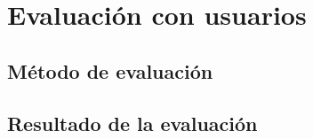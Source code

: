 
\cleardoublepage


\chapter{Evaluación con usuarios}
\label{makereference5}

\section{Método de evaluación}
\label{makereference5.1}

\section{Resultado de la evaluación}
\label{makereference5.2}
